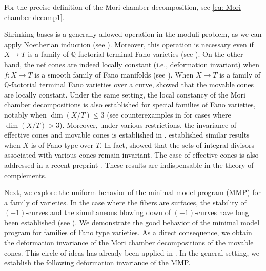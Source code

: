 \documentclass[11pt,oneside,reqno]{amsart}
\numberwithin{equation}{section}
\theoremstyle{definition}
\newcommand{\bQ}{\mathbb{Q}}
\begin{document}
For the precise definition of the Mori chamber decomposition, see \eqref{eq: Mori chamber decomp1}. 

Shrinking bases is a generally allowed operation in the moduli problem, as we can apply Noetherian induction (see \cite[II, Exercise 3.16]{Har77}). Moreover, this operation is necessary even if $X \to T$ is a family of $\bQ$-factorial terminal Fano varieties (see \cite{Totaro12}). On the other hand, the nef cones are indeed locally constant (i.e., deformation invariant) when $f: X \to T$ is a smooth family of Fano manifolds (see \cites{Wis91, Wis09}). When $X \to T$ is a family of $\mathbb{Q}$-factorial terminal Fano varieties over a curve, \cite{dFH11} showed that the movable cones are locally constant. Under the same setting, the local constancy of the Mori chamber decompositions is also established for special families of Fano varieties, notably when $\dim(X/T) \leq 3$ (see counterexamples in \cite{Totaro12} for cases where $\dim(X/T) > 3$). Moreover, under various restrictions, the invariance of effective cones and movable cones is established in \cite{HX15}. \cite[\S 4]{Sho20} established similar results when $X$ is of Fano type over $T$. In fact, \cite[\S 4]{Sho20} showed that the sets of integral divisors associated with various cones remain invariant. The case of effective cones is also addressed in a recent preprint \cite{CHHX25}. These results are indispensable in the theory of complements.

Next, we explore the uniform behavior of the minimal model program (MMP) for a family of varieties. In the case where the fibers are surfaces, the stability of $(-1)$-curves and the simultaneous blowing down of $(-1)$-curves have long been established (see \cites{Kod63, Iit70}). We demonstrate the good behavior of the minimal model program for families of Fano type varieties. As a direct consequence, we obtain the deformation invariance of the Mori chamber decompositions of the movable cones. This circle of ideas has already been applied in \cites{dFH11, HX15}. In the general setting, we establish the following deformation invariance of the MMP.
\end{document}
